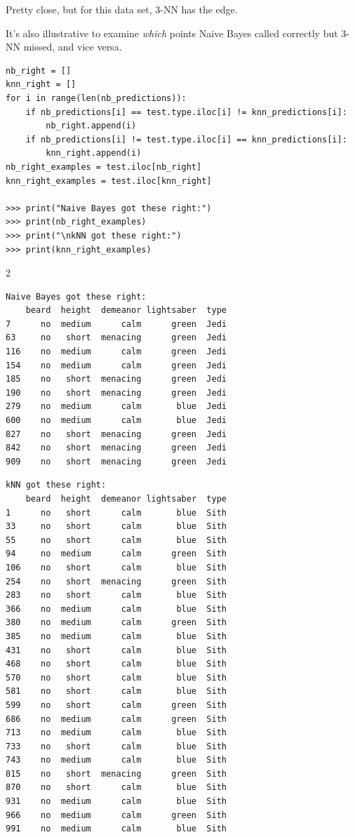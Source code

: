 Pretty close, but for this data set, 3-NN has the edge.

\pagebreak
It's also illustrative to examine \textit{which} points Naive Bayes called
correctly but 3-NN missed, and vice versa.

\begin{Verbatim}[fontsize=\footnotesize,samepage=true,frame=single]
nb_right = []
knn_right = []
for i in range(len(nb_predictions)):
    if nb_predictions[i] == test.type.iloc[i] != knn_predictions[i]:
        nb_right.append(i)
    if nb_predictions[i] != test.type.iloc[i] == knn_predictions[i]:
        knn_right.append(i)
nb_right_examples = test.iloc[nb_right]
knn_right_examples = test.iloc[knn_right]

>>> print("Naive Bayes got these right:")
>>> print(nb_right_examples)
>>> print("\nkNN got these right:")
>>> print(knn_right_examples)
\end{Verbatim}

\begin{multicols}{2}
\begin{Verbatim}[fontsize=\scriptsize,samepage=true,frame=none]
Naive Bayes got these right:
    beard  height  demeanor lightsaber  type
7      no  medium      calm      green  Jedi
63     no   short  menacing      green  Jedi
116    no  medium      calm      green  Jedi
154    no  medium      calm      green  Jedi
185    no   short  menacing      green  Jedi
190    no   short  menacing      green  Jedi
279    no  medium      calm       blue  Jedi
600    no  medium      calm       blue  Jedi
827    no   short  menacing      green  Jedi
842    no   short  menacing      green  Jedi
909    no   short  menacing      green  Jedi
\end{Verbatim}
\columnbreak
\begin{Verbatim}[fontsize=\scriptsize,samepage=true,frame=none]
kNN got these right:
    beard  height  demeanor lightsaber  type
1      no   short      calm       blue  Sith
33     no   short      calm       blue  Sith
55     no   short      calm       blue  Sith
94     no  medium      calm      green  Sith
106    no   short      calm       blue  Sith
254    no   short  menacing      green  Sith
283    no   short      calm       blue  Sith
366    no  medium      calm       blue  Sith
380    no  medium      calm      green  Sith
385    no  medium      calm       blue  Sith
431    no   short      calm       blue  Sith
468    no   short      calm       blue  Sith
570    no   short      calm       blue  Sith
581    no   short      calm       blue  Sith
599    no   short      calm      green  Sith
686    no  medium      calm      green  Sith
713    no  medium      calm       blue  Sith
733    no   short      calm       blue  Sith
743    no  medium      calm       blue  Sith
815    no   short  menacing      green  Sith
870    no   short      calm       blue  Sith
931    no  medium      calm       blue  Sith
966    no  medium      calm      green  Sith
991    no  medium      calm       blue  Sith
\end{Verbatim}
\end{multicols}
\normalsize

